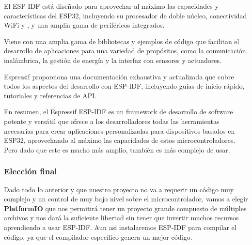 El ESP-IDF está diseñado para aprovechar al máximo las capacidades y características del ESP32, incluyendo su procesador de doble núcleo, conectividad \gls{WiFi} y , y una amplia gama de periféricos integrados.

Viene con una amplia gama de bibliotecas y ejemplos de código que facilitan el desarrollo de aplicaciones para una variedad de propósitos, como la comunicación inalámbrica, la gestión de energía y la interfaz con sensores y actuadores.

Espressif proporciona una documentación exhaustiva y actualizada que cubre todos los aspectos del desarrollo con ESP-IDF, incluyendo guías de inicio rápido, tutoriales y referencias de \gls{API}.

En resumen, el Espressif ESP-IDF es un framework de desarrollo de software potente y versátil que ofrece a los desarrolladores todas las herramientas necesarias para crear aplicaciones personalizadas para dispositivos basados en ESP32, aprovechando al máximo las capacidades de estos microcontroladores. Pero dado que este es mucho más amplio, también es más complejo de usar.

\subsubsection{Elección final}

Dado todo lo anterior y que nuestro proyecto no va a requerir un código muy complejo y un control de muy bajo nivel sobre el microcontrolador, vamos a elegir \textbf{PlatformIO} que nos permitirá tener un proyecto grande compuesto de múltiples archivos y nos dará la suficiente libertad sin tener que invertir muchos recursos aprendiendo a usar ESP-IDF. Aun asi instalaremos ESP-IDF para compilar el código, ya que el compilador específico genera un mejor código.
\newpage
